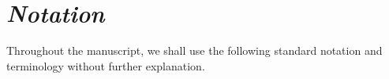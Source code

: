 \documentclass[nobib, a4paper, notoc, twoside, justified, openany]{tufte-book}
\begin{document}







\begin{fullwidth}
  \setcounter{tocdepth}{3}

\dominitoc%
\tableofcontents
\end{fullwidth}

\clearpage
{\section*{\Huge \it Notation}}
\label{sec:notations}


Throughout the manuscript, we shall use the following standard notation
and terminology without further explanation.
\end{document}
